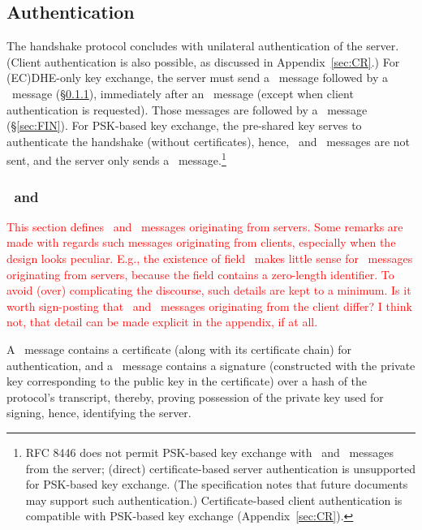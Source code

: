 \subsection{Authentication}\label{sec:handshakeAuth}

The handshake protocol concludes with unilateral authentication of the server.
(Client authentication is also possible, as discussed in Appendix~\ref{sec:CR}.)
For (EC)DHE-only key exchange, the server must send a \Certificate\ message
followed by a \CertificateVerify\ message (\S\ref{sec:CT}), immediately after an 
\EncryptedExtensions\ message (except when client authentication is requested).
Those messages are followed by a \Finished\ message (\S\ref{sec:FIN}). 
For PSK-based key exchange, the pre-shared key serves to authenticate the
handshake (without certificates), hence, \Certificate\ and \CertificateVerify\ 
messages are not sent, and the server only sends a \Finished\ message.\footnote{%
  RFC 8446 does not permit PSK-based key exchange with \Certificate\ and 
  \CertificateVerify\ messages from the server; (direct) certificate-based server 
  authentication is unsupported for PSK-based key exchange. (The specification notes 
  that future documents may support such authentication.) Certificate-based
  client authentication is compatible with PSK-based key exchange  
  (Appendix~\ref{sec:CR}).
}

\subsubsection{\Certificate\ and \CertificateVerify}\label{sec:CT}\label{sec:CV}

\ifPresentationNotes
\textcolor{red}{This section defines \Certificate\ and \CertificateVerify\ messages
  originating from servers. Some remarks are made with regards such messages originating from
  clients, especially when the design looks peculiar. E.g., the existence of field 
  \TLScertificateRequestContext\ makes little sense for \Certificate\ messages  
  originating from servers, because the field contains a zero-length identifier.
  To avoid (over) complicating the discourse, such details are kept to a minimum.
  Is it worth sign-posting that \Certificate\ and \CertificateVerify\ messages 
  originating from the client differ? I think not, that detail can be made 
  explicit in the appendix, if at all.}
\fi  

A \Certificate\ message contains a certificate (along with its certificate chain)
for authentication, and a \CertificateVerify\ message contains a 
signature (constructed with the private key corresponding to the public key in the certificate)
over a hash of the protocol's transcript, thereby, proving 
possession of the private key used for signing, hence, identifying the server.

